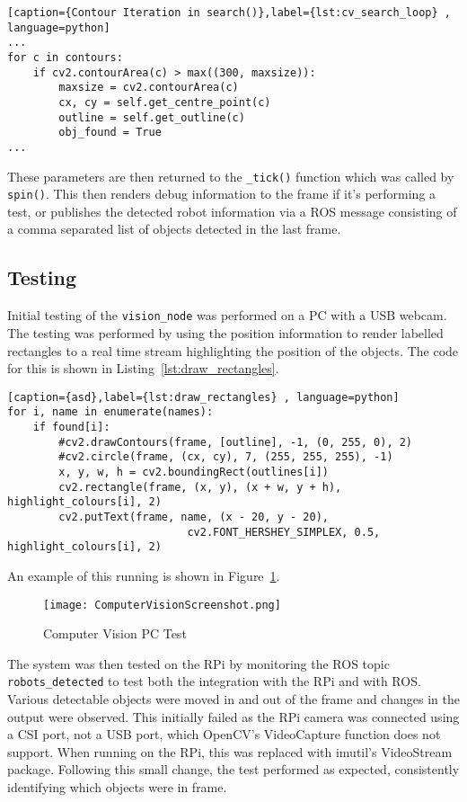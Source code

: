 \begin{lstlisting}[caption={Contour Iteration in search()},label={lst:cv_search_loop} , language=python]
...
for c in contours:
    if cv2.contourArea(c) > max((300, maxsize)):
        maxsize = cv2.contourArea(c)
        cx, cy = self.get_centre_point(c)
        outline = self.get_outline(c)
        obj_found = True
...
\end{lstlisting}

These parameters are then returned to the \verb|_tick()| function which was called by
\verb|spin()|. This then renders debug information to the frame if it's performing a test, or
publishes the detected robot information via a ROS message consisting of a comma separated list of
objects detected in the last frame.

\subsection{Testing}\label{soft/cv/test}
Initial testing of the \verb|vision_node| was performed on a PC with a USB webcam. The
testing was performed by using the position information to render labelled rectangles to a real
time stream highlighting the position of the objects. The code for this is shown in Listing~\ref{lst:draw_rectangles}.

\begin{lstlisting}[caption={asd},label={lst:draw_rectangles} , language=python]
for i, name in enumerate(names):
    if found[i]:
        #cv2.drawContours(frame, [outline], -1, (0, 255, 0), 2)
        #cv2.circle(frame, (cx, cy), 7, (255, 255, 255), -1)
        x, y, w, h = cv2.boundingRect(outlines[i])
        cv2.rectangle(frame, (x, y), (x + w, y + h), highlight_colours[i], 2)
        cv2.putText(frame, name, (x - 20, y - 20),
                            cv2.FONT_HERSHEY_SIMPLEX, 0.5, highlight_colours[i], 2)
\end{lstlisting}

An example of this running is shown in Figure~\ref{fig:cv_screenshot}.

\begin{figure}[!ht]
	\centering
	\texttt{[image: ComputerVisionScreenshot.png]}
	\caption{Computer Vision PC Test}\label{fig:cv_screenshot}
\end{figure}

The system was then tested on the RPi by monitoring the ROS topic \verb|robots_detected| to
test both the integration with the RPi and with ROS. Various detectable objects were moved in
and out of the frame and changes in the output were observed. This initially failed as the RPi
camera was connected using a CSI port, not a USB port, which OpenCV's VideoCapture function
does not support. When running on the RPi, this was replaced with imutil's VideoStream package.
Following this small change, the test performed as expected, consistently identifying which objects were in
frame.

